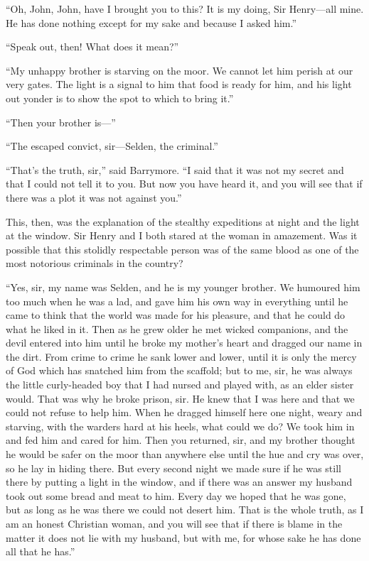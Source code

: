 \documentclass[paper=5.5in:8.5in,BCOR=7mm,twoside,DIV=calc,12pt,usegeometry,openany,chapterprefix,endperiod,headings=big]{scrbook} %
\begin{document}
\enquote{Oh, John, John, have I brought you to this? It is my doing, Sir Henry---all mine. He has done nothing except for my sake and because I asked him.}

\enquote{Speak out, then! What does it mean?}

\enquote{My unhappy brother is starving on the moor. We cannot let him perish at our very gates. The light is a signal to him that food is ready for him, and his light out yonder is to show the spot to which to bring it.}

\enquote{Then your brother is---}

\enquote{The escaped convict, sir---Selden, the criminal.}

\enquote{That's the truth, sir,} said Barrymore. \enquote{I said that it was not my secret and that I could not tell it to you. But now you have heard it, and you will see that if there was a plot it was not against you.}
%


This, then, was the explanation of the stealthy expeditions at night and the light at the window. Sir Henry and I both stared at the woman in amazement. Was it possible that this stolidly respectable person was of the same blood as one of the most notorious criminals in the country?

\enquote{Yes, sir, my name was Selden, and he is my younger brother. We humoured him too much when he was a lad, and gave him his own way in everything until he came to think that the world was made for his pleasure, and that he could do what he liked in it. Then as he grew older he met wicked companions, and the devil entered into him until he broke my mother's heart and dragged our name in the dirt. From crime to crime he sank lower and lower, until it is only the mercy of God which has snatched him from the scaffold; but to me, sir, he was always the little curly-headed boy that I had nursed and played with, as an elder sister would. That was why he broke prison, sir. He knew that I was here and that we could not refuse to help him. When he dragged himself here one night, weary and starving, with the warders hard at his heels, what could we do? We took him in and fed him and cared for him. Then you returned, sir, and my brother thought he would be safer on the moor than anywhere else until the hue and cry was over, so he lay in hiding there. But every second night we made sure if he was still there by putting a light in the window, and if there was an answer my husband took out some bread and meat to him. Every day we hoped that he was gone, but as long as he was there we could not desert him. That is the whole truth, as I am an honest Christian woman, and you will see that if there is blame in the matter it does not lie with my husband, but with me, for whose sake he has done all that he has.}
\end{document}
